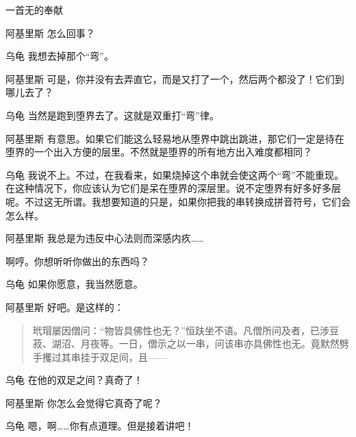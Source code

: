 \begin{dialog}{一首无的奉献\label{abcd}}
\begin{dialogue}

\item[阿基里斯]怎么回事？

\item[乌龟]我想去掉那个“弯”。

\item[阿基里斯]可是，你并没有去弄直它，而是又打了一个，然后两个都没了！它们到哪儿去了？

\item[乌龟]当然是跑到堕界去了。这就是双重打“弯”律。


\item[阿基里斯]有意思。如果它们能这么轻易地从堕界中跳出跳进，那它们一定是待在堕界的一个出入方便的层里。不然就是堕界的所有地方出入难度都相同？

\item[乌龟]我说不上。不过，在我看来，如果烧掉这个串就会使这两个“弯”不能重现。在这种情况下，你应该认为它们是呆在堕界的深层里。说不定堕界有好多好多层呢。不过这无所谓。我想要知道的只是，如果你把我的串转换成拼音符号，它们会怎么样。

\item[阿基里斯]我总是为违反中心法则而深感内疚……


啊哼。你想听听你做出的东西吗？

\item[乌龟]如果你愿意，我当然愿意。

\item[阿基里斯]好吧。是这样的：
  \begin{quote}
  玳瑁屡因僧问：“物皆具佛性也无？”恒趺坐不语。凡僧所问及者，已涉豆菽、湖沼、月夜等。一日，僧示之以一串，问该串亦具佛性也无。竟默然劈手攫过其串挂于双足间，且——
  \end{quote}

\item[乌龟]在他的双足之间？真奇了！

\item[阿基里斯]你怎么会觉得它真奇了呢？

\item[乌龟]嗯，啊……你有点道理。但是接着讲吧！


\end{dialogue}
\end{dialog}
